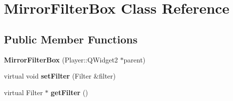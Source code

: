 \hypertarget{classMirrorFilterBox}{}\section{Mirror\+Filter\+Box Class Reference}
\label{classMirrorFilterBox}
\subsection*{Public Member Functions}
\begin{DoxyCompactItemize}
\item 
\hypertarget{classMirrorFilterBox_a6324665d168e0a9afb9acccda048c02b}{}{\bfseries Mirror\+Filter\+Box} (Player\+::\+Q\+Widget2 $\ast$parent)\label{classMirrorFilterBox_a6324665d168e0a9afb9acccda048c02b}

\item 
\hypertarget{classMirrorFilterBox_a09e99b0db09b8468ce7d7e0f98293ac5}{}virtual void {\bfseries set\+Filter} (Filter \&filter)\label{classMirrorFilterBox_a09e99b0db09b8468ce7d7e0f98293ac5}

\item 
\hypertarget{classMirrorFilterBox_ad7b14770615490d1445c958c79fd3adb}{}virtual Filter $\ast$ {\bfseries get\+Filter} ()\label{classMirrorFilterBox_ad7b14770615490d1445c958c79fd3adb}

\end{DoxyCompactItemize}
